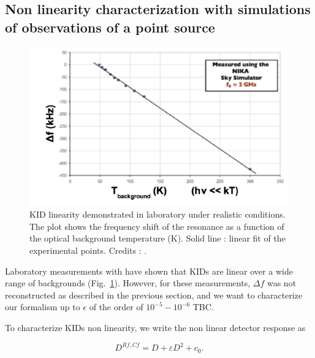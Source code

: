 
{\color{blue} 
\subsection{Non linearity characterization with simulations of observations of a point source}

\begin{figure}
\center
\includegraphics[clip, angle=0, width=\columnwidth]{../Figures/KID-linearity-Monfardini2014.png}
\caption{KID linearity demonstrated in laboratory under realistic
  conditions. The plot shows the frequency shift of the resonance as a function
  of the optical background temperature (K). Solid line : linear fit of the
  experimental points. Credits : \citet{2014JLTP..176..787M}.}
\label{fig:KID-lin}
\end{figure}

Laboratory measurements with  have shown that
KIDs are linear over a wide range of backgrounds
(Fig.~\ref{fig:KID-lin}). However, for these measurements, $\Delta f$ was not
reconstructed as described in the previous section, and we want to characterize
our formalism up to $\epsilon$ of the order of $10^{-5}-10^{-6} $ TBC.

To characterize KIDs non linearity, we write the non linear detector response as 

\begin{equation}
D^{Rf,Cf} = D + \varepsilon D^2 +c_{0}.
\label{eq:model_kid_nl}
\end{equation}

}
